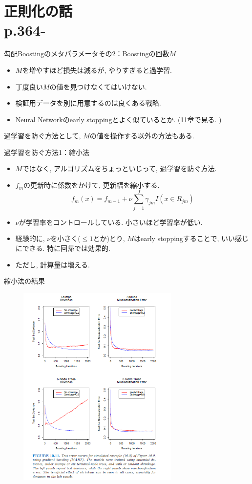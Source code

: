 \documentclass[dvipdfmx,8pt]{beamer}
\begin{document}
  \section{正則化の話\\p.364-}
  \begin{frame}{勾配Boostingのメタパラメータその2：Boostingの回数$M$}
    \begin{itemize}
      \item $M$を増やすほど損失は減るが, やりすぎると過学習.
      \item 丁度良い$M$の値を見つけなくてはいけない.
      \item 検証用データを別に用意するのは良くある戦略.
      \item Neural Networkのearly stoppingとよく似ているとか. (11章で見る. )
    \end{itemize}
    過学習を防ぐ方法として, $M$の値を操作する以外の方法もある.
  \end{frame}
  \begin{frame}{過学習を防ぐ方法1：縮小法}
    \begin{itemize}
      \item $M$ではなく, アルゴリズムをちょっといじって, 過学習を防ぐ方法.
      \item $f_m$の更新時に係数をかけて, 更新幅を縮小する.
      \[
        f_m(x)=f_{m-1}+\nu\sum_{j=1}^J\gamma_{jm}I(x\in R_{jm})
      \]
      \item $\nu$が学習率をコントロールしている. 小さいほど学習率が低い.
      \item 経験的に, $\nu$を小さく($\le 1$とか)とり, $M$はearly stoppingすることで, いい感じにできる. 特に回帰では効果的.
      \item ただし, 計算量は増える.
    \end{itemize}
  \end{frame}
  \begin{frame}{縮小法の結果}
    \begin{figure}[htb]
      \centering
      \includegraphics[width=8cm,clip]{images/Shrinkage.png}
    \end{figure}
  \end{frame}
\end{document}
